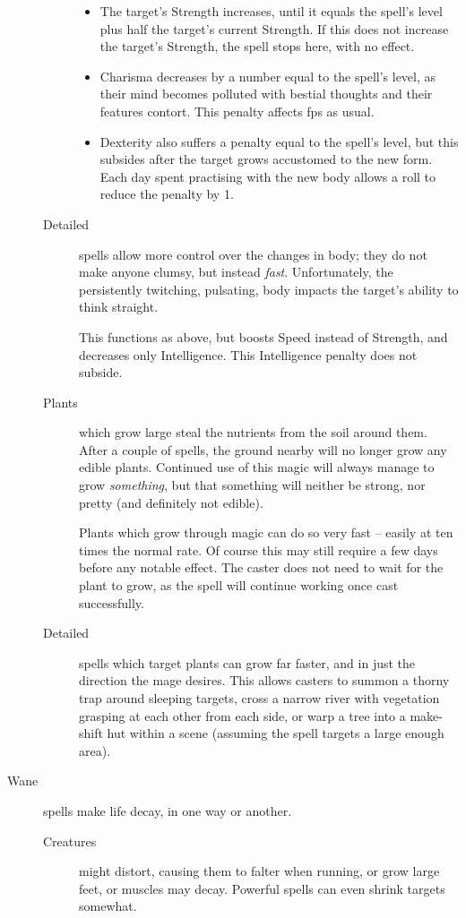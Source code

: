 \begin{multicols}{2}
\begin{description}
\begin{description}
        \begin{itemize}
          \item
          The target's Strength increases, until it equals the spell's level plus half the target's current Strength.
          If this does not increase the target's Strength, the spell stops here, with no effect.
          \item
          Charisma decreases by a number equal to the spell's level, as their mind becomes polluted with bestial thoughts and their features contort.
          This penalty affects \glspl{fp} as usual.
          \item
          Dexterity also suffers a penalty equal to the spell's level, but this subsides after the target grows accustomed to the new form.
          Each day spent practising with the new body allows a  roll to reduce the penalty by 1.
        \end{itemize}
      \item[Detailed]
        spells allow more control over the changes in body; they do not make anyone clumsy, but instead \emph{fast}.
        Unfortunately, the persistently twitching, pulsating, body impacts the target's ability to think straight.

        This functions as above, but boosts Speed instead of Strength, and decreases only Intelligence.
        This Intelligence penalty does not subside.
      \item[Plants]
        which grow large steal the nutrients from the soil around them.
        After a couple of spells, the ground nearby will no longer grow any edible plants.
        Continued use of this magic will always manage to grow \emph{something}, but that something will neither be strong, nor pretty (and definitely not edible).

        Plants which grow through magic can do so very fast -- easily at ten times the normal rate.
        Of course this may still require a few days before any notable effect.
        The caster does not need to wait for the plant to grow, as the spell will continue working once cast successfully.
      \item[Detailed]
        spells which target plants can grow far faster, and in just the direction the mage desires.
        This allows casters to summon a thorny trap around sleeping targets, cross a narrow river with vegetation grasping at each other from each side, or warp a tree into a make-shift hut within a scene (assuming the spell targets a large enough area).
    \end{description}
  \item[Wane]
  spells make life decay, in one way or another.
    \begin{description}
      \item[Creatures]
        might distort, causing them to falter when running, or grow large feet, or muscles may decay.
        Powerful spells can even shrink targets somewhat.


\end{description}
\end{description}
\end{multicols}
